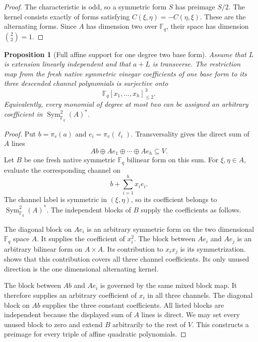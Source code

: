 \documentclass[11pt]{article}
\newcommand{\F}{\mathbb F}
\newcommand{\Sym}{\operatorname{Sym}}
\theoremstyle{plain}
\newtheorem{proposition}[theorem]{Proposition}
\theoremstyle{definition}
\theoremstyle{remark}
\begin{document}
\begin{proof}
The characteristic is odd, so a symmetric form $S$ has preimage $S/2$.
The kernel consists exactly of forms satisfying
$C(\xi,\eta)=-C(\eta,\xi)$.  These are the alternating forms.  Since $A$
has dimension two over $\F_q$, their space has dimension
$\binom{2}{2}=1$.
\end{proof}

\begin{proposition}[Full affine support for one degree two base form]
\label{prop:l2-support}
Assume that $L$ is extension linearly independent and that $a+L$ is
transverse.  The restriction map from the fresh native symmetric vinegar
coefficients of one base form to its three descended channel polynomials is
surjective onto
\[
  \F_q[x_1,\ldots,x_h]_{\leq 2}^{\,3}.
\]
Equivalently, every monomial of degree at most two can be assigned an
arbitrary coefficient in $\Sym^2_{\F_q}(A)^*$.
\end{proposition}

\begin{proof}
Put $b=\pi_v(a)$ and $e_i=\pi_v(\ell_i)$.  Transversality gives the direct
sum of $A$ lines
\[
  Ab\oplus Ae_1\oplus\cdots\oplus Ae_h\subseteq V.
\]
Let $B$ be one fresh native symmetric $\F_q$ bilinear form on this sum.  For
$\xi,\eta\in A$, evaluate the corresponding channel on
\[
  b+\sum_{i=1}^h x_i e_i.
\]
The channel label is symmetric in $(\xi,\eta)$, so its coefficient belongs
to $\Sym^2_{\F_q}(A)^*$.  The independent blocks of $B$ supply the
coefficients as follows.

The diagonal block on $Ae_i$ is an arbitrary symmetric form on the two
dimensional $\F_q$ space $A$.  It supplies the coefficient of $x_i^2$.
The block between $Ae_i$ and $Ae_j$ is an arbitrary bilinear form on
$A\times A$.  Its contribution to $x_ix_j$ is its symmetrization.
 shows that this contribution covers all three
channel coefficients.  Its only unused direction is the one dimensional
alternating kernel.

The block between $Ab$ and $Ae_i$ is governed by the same mixed block map.
It therefore supplies an arbitrary coefficient of $x_i$ in all three
channels.  The diagonal block on $Ab$ supplies the three constant
coefficients.  All listed blocks are independent because the displayed sum
of $A$ lines is direct.  We may set every unused block to zero and extend $B$
arbitrarily to the rest of $V$.  This constructs a preimage for every triple
of affine quadratic polynomials.
\end{proof}
\end{document}
